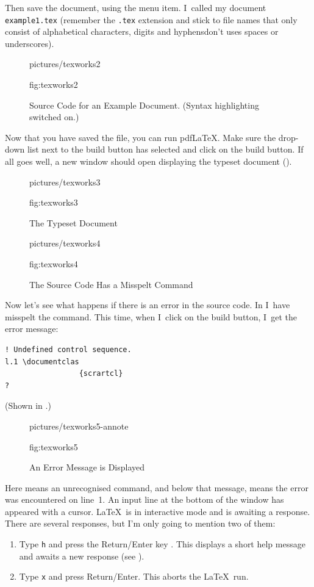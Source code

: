 Then save the document, using the
\menuto{} menu item. I~called my document
\texttt{example1.tex} (remember the \texttt{.tex} extension and
stick to file names that only consist of alphabetical characters,
digits and hyphens\dash don't uses spaces or underscores).

\begin{figure}[htbp]
\figconts
  {pictures/texworks2}
  {%
    \caption[Source Code for an Example Document]{Source Code for an 
     Example Document. (Syntax highlighting switched on.)}%
  }%
  {fig:texworks2}
\end{figure}

Now that you have saved the file, you can run pdfLaTeX. Make sure
the drop-down list next to the build button has 
selected and click on the build button. If all goes well, a new
window should open displaying the typeset document
().

\begin{figure}[htbp]
\figconts
  {pictures/texworks3}
  {%
    \caption{The Typeset Document}
  }%
  {fig:texworks3}
\end{figure}

\begin{figure}[htbp]
\figconts
  {pictures/texworks4}
  {%
    \caption{The Source Code Has a Misspelt Command}
  }%
  {fig:texworks4}
\end{figure}

Now let's see what happens if there is an error in the source code.
In  I~have misspelt the
 command. This time, when I~click on the
build button, I~get the error message:
\begin{verbatim}
! Undefined control sequence.
l.1 \documentclas
                 {scrartcl}
?
\end{verbatim}
(Shown in .)

\begin{figure}[htbp]
\figconts
  {pictures/texworks5-annote}
  {%
     \caption{An Error Message is Displayed}%
  }%
  {fig:texworks5}
\end{figure}


Here  means an unrecognised command,
and below that message,  means the error was encountered on
line~1. An input line at the bottom of the window has appeared with a
cursor. \LaTeX\ is in interactive mode
and is awaiting a response. There are several responses, but I'm
only going to mention two of them:
\begin{enumerate}
\item Type \texttt{h} and press the Return/Enter key \enter. This displays
a short help message and awaits a new response (see
).

\item Type \texttt{x} and press Return/Enter. This aborts the
\LaTeX\ run.
\end{enumerate}

